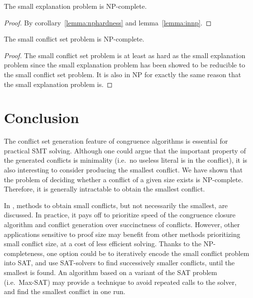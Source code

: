 \documentclass[smallextended]{svjour3}
\begin{document}
\begin{theorem}
The small explanation problem is NP-complete.
\end{theorem}
\begin{proof}
By corollary~\ref{lemma:nphardness} and lemma~\ref{lemma:innp}.
\end{proof}

\begin{theorem}
The small conflict set problem is NP-complete.
\end{theorem}
\begin{proof}
The small conflict set problem is at least as hard as the small explanation problem since the small explanation problem has been showed to be reducible to the small conflict set problem.  It is also in NP for exactly the same reason that the small explanation problem is.
\end{proof}


\section{Conclusion}

The conflict set generation feature of congruence algorithms is essential for
practical SMT solving.  Although one could argue that the important property of the generated conflicts is minimality (i.e.\ no useless literal is in the conflict), it is also interesting to consider producing the smallest conflict.  We have shown that the problem of deciding whether a conflict of a given size exists is NP-complete. Therefore, it is generally intractable to obtain the smallest conflict. 

In \cite{Fontaine1,Nieuwenhuis3,Nieuwenhuis9}, methods to obtain small
conflicts, but not necessarily the smallest, are discussed.  In practice, it
pays off to prioritize speed of the congruence closure algorithm and conflict
generation over succinctness of conflicts.  However, other applications
sensitive to proof size may benefit from other methods prioritizing small
conflict size, at a cost of less efficient solving. Thanks to the
NP-completeness, one option could be to iteratively encode the small conflict
problem into SAT, and use SAT-solvers to find successively smaller conflicts,
until the smallest is found.  An algorithm based on a variant of the SAT problem
(i.e.\ Max-SAT) may provide a technique to avoid repeated calls to the solver,
and find the smallest conflict in one run.
\end{document}
